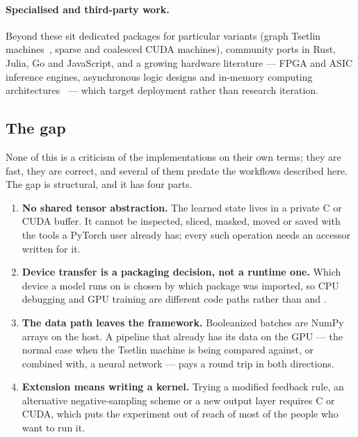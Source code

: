 \paragraph{Specialised and third-party work.}
Beyond these sit dedicated packages for particular variants (graph Tsetlin
machines~, sparse and coalesced CUDA machines), community ports in Rust, Julia, Go
and JavaScript, and a growing hardware literature --- FPGA and ASIC inference engines,
asynchronous logic designs and in-memory computing
architectures~ --- which target deployment rather than research iteration.

\subsection{The gap}

None of this is a criticism of the implementations on their own terms; they are fast, they
are correct, and several of them predate the workflows described here. The gap is structural,
and it has four parts.

\begin{enumerate}[leftmargin=1.4em, itemsep=0.3em, topsep=0.35em]
  \item \textbf{No shared tensor abstraction.} The learned state lives in a private C or CUDA
    buffer. It cannot be inspected, sliced, masked, moved or saved with the tools a PyTorch
    user already has; every such operation needs an accessor written for it.
  \item \textbf{Device transfer is a packaging decision, not a runtime one.} Which device a
    model runs on is chosen by which package was imported, so CPU debugging and GPU training
    are different code paths rather than  and .
  \item \textbf{The data path leaves the framework.} Booleanized batches are NumPy arrays on
    the host. A pipeline that already has its data on the GPU --- the normal case when the
    Tsetlin machine is being compared against, or combined with, a neural network --- pays a
    round trip in both directions.
  \item \textbf{Extension means writing a kernel.} Trying a modified feedback rule, an
    alternative negative-sampling scheme or a new output layer requires C or CUDA, which puts
    the experiment out of reach of most of the people who want to run it.
\end{enumerate}

